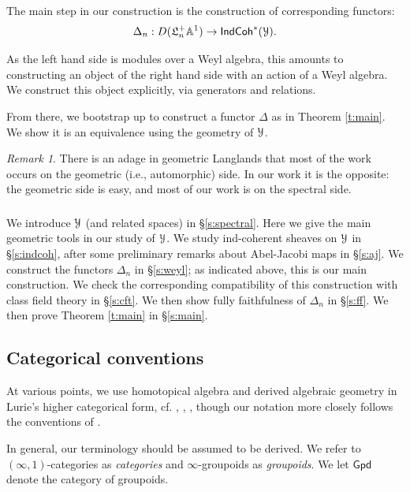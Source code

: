 \documentclass[reqno,11pt]{amsart}
\numberwithin{equation}{subsection}
\theoremstyle{remark}
\newtheorem{rem}[thm]{Remark}
\newcommand{\bA}{{\mathbb A}}
\newcommand{\sY}{{\EuScript Y}}
\newcommand{\fL}{{\mathfrak L}}
\newcommand{\Gpd}{\mathsf{Gpd}}
\newcommand{\IndCoh}{\mathsf{IndCoh}}
\begin{document}
The main step in our construction is the construction of corresponding
functors:
%
\[
\Delta_n:D(\fL_n^+\bA^1) \to \IndCoh^*(\sY).
\]

\noindent As the left hand side is modules over a Weyl algebra, this amounts
to constructing an object of the right hand side with an action of a Weyl
algebra. We construct this object explicitly, via generators and relations. 

From there, we bootstrap up to construct a functor
$\Delta$ as in Theorem \ref{t:main}. We show it is an equivalence using 
the geometry of $\sY$.

\begin{rem}

There is an adage in geometric Langlands that most of the work occurs on the
geometric (i.e., automorphic) side. In our work it is the opposite: the 
geometric side is easy, and most of our work is on the spectral side. 

\end{rem}

\subsubsection{}

We introduce $\sY$ (and related spaces) in \S \ref{s:spectral}. Here we
give the main geometric tools in our study of $\sY$. We study
ind-coherent sheaves on $\sY$ in \S \ref{s:indcoh}, after some preliminary 
remarks about Abel-Jacobi maps in \S \ref{s:aj}. We construct the
functors $\Delta_n$ in \S \ref{s:weyl}; as indicated above, this is our main
construction. We check the corresponding compatibility of this construction 
with class field theory
in \S \ref{s:cft}. We then show fully faithfulness of $\Delta_n$ in 
\S \ref{s:ff}. We then prove Theorem \ref{t:main} in \S \ref{s:main}.

\subsection{Categorical conventions}

At various points, we use homotopical algebra and derived
algebraic geometry in Lurie's higher categorical form,
cf. \cite{htt}, \cite{higheralgebra}, \cite{sag}, though our notation more
closely follows the conventions of \cite{grbook}.

In general, our terminology should be assumed to be derived.
We refer to $(\infty,1)$-categories as \emph{categories} and 
$\infty$-groupoids as \emph{groupoids}. We let
$\Gpd$ denote the category of groupoids.
\end{document}
